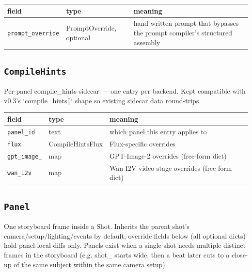 \begin{longtable}{@{}R{0.24\textwidth}R{0.21\textwidth}R{0.49\textwidth}@{}}
\toprule \textbf{field} & \textbf{type} & \textbf{meaning} \\ \midrule
\endhead
\texttt{prompt\_\allowbreak override} & PromptOverride, optional & hand-written prompt that bypasses the prompt compiler's structured assembly \\
\bottomrule
\end{longtable}

\subsection*{\texttt{CompileHints}}
\noindent Per-panel compile\_\allowbreak hints sidecar ---\allowbreak{} one entry per backend. Kept compatible with v0.3's `compile\_\allowbreak hints[]` shape so existing sidecar data round-trips.

\begin{longtable}{@{}R{0.24\textwidth}R{0.21\textwidth}R{0.49\textwidth}@{}}
\toprule \textbf{field} & \textbf{type} & \textbf{meaning} \\ \midrule
\endhead
\texttt{panel\_\allowbreak id} & text & which panel this entry applies to \\
\texttt{flux} & CompileHintsFlux & Flux-specific overrides \\
\texttt{gpt\_\allowbreak image\_} & map & GPT-Image-2 overrides (free-form dict) \\
\texttt{wan\_\allowbreak i2v} & map & Wan-I2V video-stage overrides (free-form dict) \\
\bottomrule
\end{longtable}

\subsection*{\texttt{Panel}}
\noindent One storyboard frame inside a Shot. Inherits the parent shot's camera/\allowbreak{}setup/\allowbreak{}lighting/\allowbreak{}events by default; override fields below (all optional dicts) hold panel-local diffs only. Panels exist when a single shot needs multiple distinct frames in the storyboard (e.g. shot\_ starts wide, then a beat later cuts to a close-up of the same subject within the same camera setup).

